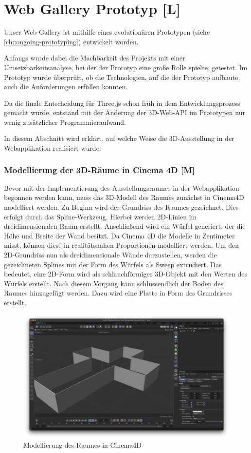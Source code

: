 \section{Web Gallery Prototyp [L]}
Unser Web-Gallery ist mithilfe eines evolutionären Prototypen (siehe  \ref{ch::ongoing-prototyping}) entwickelt worden.


Anfangs wurde dabei die Machbarkeit des Projekts mit einer Umsetzbarkeitsanalyse, bei der der Prototyp eine große Rolle spielte, getestet. Im Prototyp wurde überprüft, ob die Technologien, auf die der Prototyp aufbaute, auch die Anforderungen erfüllen konnten.

Da die finale Entscheidung für Three.js schon früh in dem Entwicklungsprozess gemacht wurde, entstand mit der Änderung der 3D-Web-API im Prototypen nur wenig zusätzlicher Programmieraufwand.

In diesem Abschnitt wird erklärt, auf welche Weise die 3D-Ausstellung in der Webapplikation realisiert wurde.

\subsubsection{Modellierung der 3D-Räume in Cinema 4D [M]}
Bevor mit der Implementierung des Ausstellungsraumes in der Webapplikation begonnen werden kann, muss das 3D-Modell des Raumes zunächst in Cinema4D modelliert werden. Zu Beginn wird der Grundriss des Raumes gezeichnet. Dies erfolgt durch das Spline-Werkzeug. Hierbei werden 2D-Linien im dreidimensionalen Raum erstellt. Anschließend wird ein Würfel generiert, der die Höhe und Breite der Wand besitzt. Da Cinema 4D die Modelle in Zentimeter misst, können diese in realitätsnahen Proportionen modelliert werden. Um den 2D-Grundriss nun als dreidimensionale Wände darzustellen, werden die gezeichneten Splines mit der Form des Würfels als Sweep extrudiert. Das bedeutet, eine 2D-Form wird als schlauchförmiges 3D-Objekt mit den Werten des Würfels erstellt. Nach diesem Vorgang kann schlussendlich der Boden des Raumes hinzugefügt werden. Dazu wird eine Platte in Form des Grundrisses erstellt. 

\begin{figure} [h t]
    \centering
    \includegraphics[scale=0.2]{pics/Room-model.png}
    \caption{Modellierung des Raumes in Cinema4D}
    \label{fig:tech:front:room-model}
  \end{figure}


